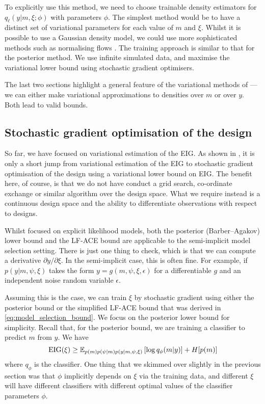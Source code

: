 \documentclass[a4paper, 10pt]{report}
\theoremstyle{plain}
\begin{document}
	To explicitly use this method, we need to choose trainable density estimators for $q_\ell(y|m,\xi; \phi)$ with parameters $\phi$.
	The simplest method would be to have a distinct set of variational parameters for each value of $m$ and $\xi$.
	Whilst it is possible to use a Gaussian density model, we could use more sophisticated methods such as normalising flows \citep{rezende2015variational}. The training approach is similar to that for the posterior method.
	We use infinite simulated data, and maximise the variational lower bound using stochastic gradient optimisers.
	
	
	The last two sections highlight a general feature of the variational methods of \citet{foster2019variational}---we can either make variational approximations to densities over $m$ or over $y$. Both lead to valid bounds.
	
	\subsection{Stochastic gradient optimisation of the design}
	So far, we have focused on variational estimation of the EIG.
	As shown in \citet{foster2020unified}, it is only a short jump from variational estimation of the EIG to stochastic gradient optimisation of the design using a variational lower bound on EIG.
	The benefit here, of course, is that we do not have conduct a grid search, co-ordinate exchange or similar algorithm over the design space.
	What we require instead is a continuous design space and the ability to differentiate observations with respect to designs.
	
	Whilst \citet{foster2020unified} focused on explicit likelihood models, both the posterior (Barber--Agakov) lower bound and the LF-ACE bound are applicable to the semi-implicit model selection setting. There is just one thing to check, which is that we can compute a derivative $\partial y/\partial \xi$.
	In the semi-implicit case, this is often fine. For example, if $p(y|m,\psi,\xi)$ takes the form $y = g(m,\psi,\xi,\epsilon)$ for a differentiable $g$ and an independent noise random variable $\epsilon$.
	
	Assuming this is the case, we can train $\xi$ by stochastic gradient using either the posterior bound or the simplified LF-ACE bound that was derived in \eqref{eq:model_selection_bound}.
	We focus on the posterior lower bound for simplicity.
	Recall that, for the posterior bound, we are training a classifier to predict $m$ from $y$.
	We have
	\begin{equation}
	\text{EIG}(\xi) \ge \mathbb{E}_{p(m)p(\psi|m)p(y|m,\psi,\xi)}\left[ \log q_\phi(m|y) \right] + H[p(m)]
	\end{equation}
	where $q_\phi$ is the classifier.
	One thing that we skimmed over slightly in the previous section was that $\phi$ implicitly depends on $\xi$ via the training data, and different $\xi$ will have different classifiers with different optimal values of the classifier parameters $\phi$.
	
\end{document}
